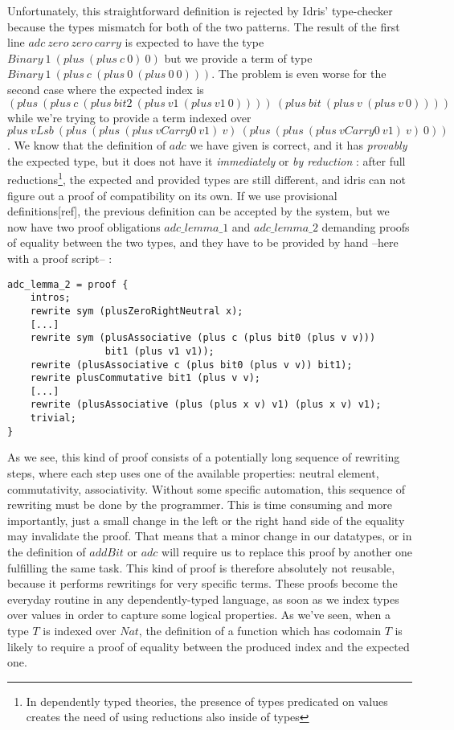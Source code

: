 Unfortunately, this straightforward definition is rejected by Idris' type-checker because the types mismatch for both of the two patterns. The result of the first line $adc\ zero\ zero\ carry$ is expected to have the type $Binary\ 1\ (plus\ (plus\ c\ 0)\ 0)$ but we provide a term of type $Binary\ 1\ (plus\ c\ (plus\ 0\ (plus\ 0\ 0)))$.
The problem is even worse for the second case where the expected index is \\
$(plus\ (plus\ c\ (plus\ bit2\ (plus\ v1\ (plus\ v1\ 0))))\ (plus\ bit\ (plus\ v\ (plus\ v\ 0))))$
while we're trying to provide a term indexed over \\
$plus\ vLsb\ (plus\ (plus\ (plus\ vCarry0\ v1)\ v)\ (plus\ (plus\ (plus\ vCarry0\ v1)\ v)\ 0))$.
We know that the definition of $adc$ we have given is correct, and it has \emph{provably} the expected type, but it does not have it \emph{immediately} or \emph{by reduction} : after full reductions\footnote{In dependently typed theories, the presence of types predicated on values creates the need of using reductions also inside of types}, the expected and provided types are still different, and idris can not figure out a proof of compatibility on its own. 
If we use provisional definitions[ref], the previous definition can be accepted by the system, but we now have two proof obligations $adc\_lemma\_1$ and $adc\_lemma\_2$ demanding proofs of equality between the two types, and they have to be provided by hand --here with a proof script-- :

\begin{lstlisting}
adc_lemma_2 = proof {
    intros;
    rewrite sym (plusZeroRightNeutral x);
    [...]
    rewrite sym (plusAssociative (plus c (plus bit0 (plus v v))) 
                 bit1 (plus v1 v1));
    rewrite (plusAssociative c (plus bit0 (plus v v)) bit1);
    rewrite plusCommutative bit1 (plus v v);
    [...]
    rewrite (plusAssociative (plus (plus x v) v1) (plus x v) v1);
    trivial;
}
\end{lstlisting}

As we see, this kind of proof consists of a potentially long sequence of rewriting steps, where each step uses one of the available properties: neutral element, commutativity, associativity. Without some specific automation, this sequence of rewriting must be done by the programmer.
This is time consuming and more importantly, just a small change in the left or the right hand side of the equality may invalidate the proof. That means that a minor change in our datatypes, or in the definition of $addBit$ or $adc$ will require us to replace this proof by another one fulfilling the same task.
This kind of proof is therefore absolutely not reusable, because it performs rewritings for very specific terms.
These proofs become the everyday routine in any dependently-typed language, as soon as we index types over values in order to capture some logical properties.  As we've seen, when a type $T$ is indexed over $Nat$, the definition of a function which has codomain $T$ is likely to require a proof of equality between the produced index and the expected one. 

